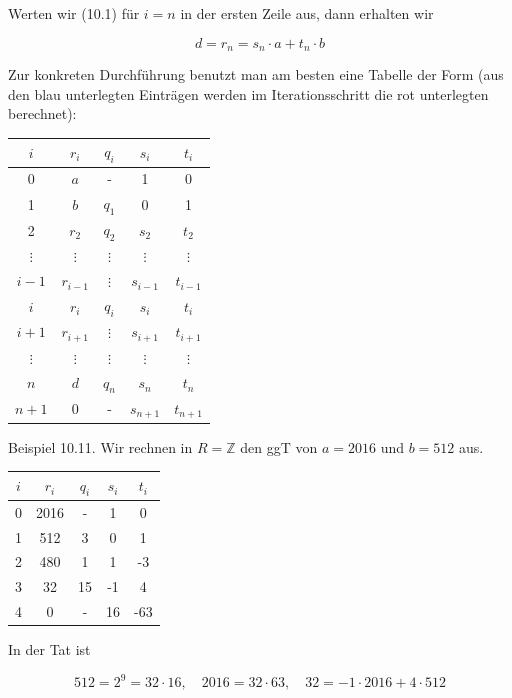 \documentclass[10pt, letterpaper]{article}
\begin{document}
Werten wir (10.1) für $i=n$ in der ersten Zeile aus, dann erhalten wir

$$
d=r_{n}=s_{n} \cdot a+t_{n} \cdot b
$$

Zur konkreten Durchführung benutzt man am besten eine Tabelle der Form (aus den blau unterlegten Einträgen werden im Iterationsschritt die rot unterlegten berechnet):

\begin{center}
\begin{tabular}{c||c|c|c|c}
$i$ & $r_{i}$ & $q_{i}$ & $s_{i}$ & $t_{i}$ \\
\hline
0 & $a$ & - & 1 & 0 \\
1 & $b$ & $q_{1}$ & 0 & 1 \\
2 & $r_{2}$ & $q_{2}$ & $s_{2}$ & $t_{2}$ \\
$\vdots$ & $\vdots$ & $\vdots$ & $\vdots$ & $\vdots$ \\
$i-1$ & $r_{i-1}$ & $\vdots$ & $s_{i-1}$ & $t_{i-1}$ \\
$i$ & $r_{i}$ & $q_{i}$ & $s_{i}$ & $t_{i}$ \\
$i+1$ & $r_{i+1}$ & $\vdots$ & $s_{i+1}$ & $t_{i+1}$ \\
$\vdots$ & $\vdots$ & $\vdots$ & $\vdots$ & $\vdots$ \\
$n$ & $d$ & $q_{n}$ & $s_{n}$ & $t_{n}$ \\
$n+1$ & 0 & - & $s_{n+1}$ & $t_{n+1}$ \\
\end{tabular}
\end{center}

Beispiel 10.11. Wir rechnen in $R=\mathbb{Z}$ den ggT von $a=2016$ und $b=512$ aus.

\begin{center}
\begin{tabular}{c||c|c|c|c}
$i$ & $r_{i}$ & $q_{i}$ & $s_{i}$ & $t_{i}$ \\
\hline
0 & 2016 & - & 1 & 0 \\
1 & 512 & 3 & 0 & 1 \\
2 & 480 & 1 & 1 & -3 \\
3 & 32 & 15 & -1 & 4 \\
4 & 0 & - & 16 & -63 \\
\end{tabular}
\end{center}

In der Tat ist

$$
512=2^{9}=32 \cdot 16, \quad 2016=32 \cdot 63, \quad 32=-1 \cdot 2016+4 \cdot 512
$$
\end{document}
